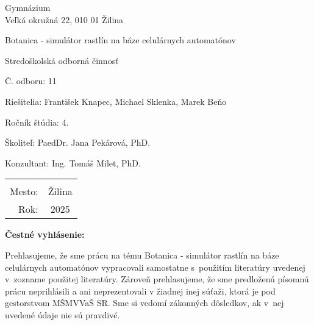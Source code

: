 \documentclass[12pt]{article}
\begin{document}
\begin{titlepage}
    \setlength{\parindent}{0pt}

    \begin{center}
        Gymnázium \\
        Veľká okružná 22, 010 01 Žilina

        \vspace{7cm}
        \Huge Botanica - simulátor rastlín na báze celulárnych automatónov

        \vspace{1.13cm}
        \Large Stredoškolská odborná činnosť

        \vspace{2.12cm}
        \normalsize Č. odboru: 11
    \end{center}

    \vfill

    \begin{minipage}{0.75\textwidth}
        Riešitelia: František Knapec, Michael Sklenka, Marek Beňo \par
        Ročník štúdia: 4. \par
        Školiteľ: PaedDr. Jana Pekárová, PhD.\par
        Konzultant: Ing. Tomáš Milet, PhD.
    \end{minipage}
    \hfill
    \begin{minipage}{0.23\textwidth}
        \hfil %
        \begin{tabular}{rc}
            \\ \\
            Mesto: & Žilina \\
            Rok:   & 2025
        \end{tabular}
    \end{minipage}
\end{titlepage}

\setcounter{page}{3}

%
%

\thispagestyle{empty}

\noindent
\textbf{Čestné vyhlásenie:}

\noindent
Prehlasujeme, že sme prácu na tému
Botanica - simulátor rastlín na báze celulárnych automatónov
vypracovali samostatne s~použitím literatúry uvedenej v~zozname použitej literatúry.
Zároveň prehlasujeme, že sme predloženú písomnú prácu neprihlásili a ani neprezentovali
v žiadnej inej súťaži, ktorá je pod gestorstvom MŠMVVaŠ SR. Sme si vedomí zákonných dôsledkov,
ak v~nej uvedené údaje nie sú pravdivé.
\end{document}
